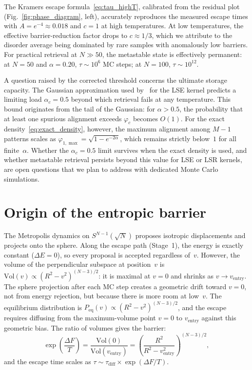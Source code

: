 \documentclass[11pt]{article}
\begin{document}
The Kramers escape formula~\eqref{eq:tau_highT}, calibrated from the residual plot (Fig.~\ref{fig:phase_diagram}, left), accurately reproduces the measured escape times with $A = e^{-4} \approx 0.018$ and $c = 1$ at high temperatures.  At low temperatures, the effective barrier-reduction factor drops to $c \approx 1/3$, which we attribute to the disorder average being dominated by rare samples with anomalously low barriers.  For practical retrieval at $N \gg 50$, the metastable state is effectively permanent: at $N = 50$ and $\alpha = 0.20$, $\tau \sim 10^6$ MC steps; at $N = 100$, $\tau \sim 10^{12}$.

A question raised by the corrected threshold concerns the ultimate storage capacity.  The Gaussian approximation used by~\citet{ramsauer2021hopfield} for the LSE kernel predicts a limiting load $\alpha_c = 0.5$ beyond which retrieval fails at any temperature.  This bound originates from the tail of the Gaussian: for $\alpha > 0.5$, the probability that at least one spurious alignment exceeds $\varphi_c$ becomes $O(1)$.  For the exact density~\eqref{eq:exact_density}, however, the maximum alignment among $M - 1$ patterns scales as $\varphi_{1,\max} = \sqrt{1 - e^{-2\alpha}}$, which remains strictly below~$1$ for all finite~$\alpha$.  Whether the $\alpha_c = 0.5$ limit survives when the exact density is used, and whether metastable retrieval persists beyond this value for LSE or LSR kernels, are open questions that we plan to address with dedicated Monte Carlo simulations.



\appendix

\section{Origin of the entropic barrier}
\label{app:barrier}

The Metropolis dynamics on $S^{N-1}(\!\sqrt{N})$ proposes isotropic displacements and projects onto the sphere.  Along the escape path (Stage~1), the energy is exactly constant ($\Delta E = 0$), so every proposal is accepted regardless of~$v$.  However, the volume of the perpendicular subspace at position~$v$ is $\mathrm{Vol}(v) \propto (R^2 - v^2)^{(N-3)/2}$: it is maximal at $v = 0$ and shrinks as $v \to v_{\mathrm{entry}}$.  The sphere projection after each MC step creates a geometric drift toward $v = 0$, not from energy rejection, but because there is more room at low~$v$.  The equilibrium distribution is $P_{\mathrm{eq}}(v) \propto (R^2 - v^2)^{(N-3)/2}$, and the escape requires diffusing from the maximum-volume point $v = 0$ to $v_{\mathrm{entry}}$ against this geometric bias.  The ratio of volumes gives the barrier:
\[
\exp\!\left(\frac{\Delta F}{T}\right) = \frac{\mathrm{Vol}(0)}{\mathrm{Vol}(v_{\mathrm{entry}})} = \left(\frac{R^2}{R^2 - v_{\mathrm{entry}}^2}\right)^{(N-3)/2}\!,
\]
and the escape time scales as $\tau \sim \tau_{\mathrm{diff}} \times \exp(\Delta F/T)$.
\end{document}
